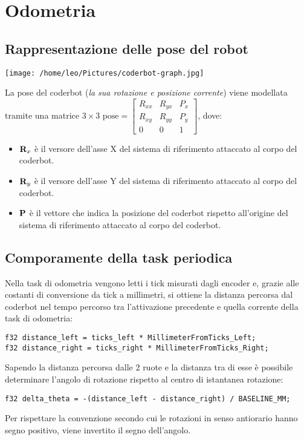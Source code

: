 \documentclass[11pt]{article}
\begin{document}
\section{Odometria}
\label{sec:orgf92f562}
\subsection{Rappresentazione delle pose del robot}
\label{sec:org5b5d30e}
\begin{center}
\texttt{[image: /home/leo/Pictures/coderbot-graph.jpg]}
\end{center}

La pose del coderbot (\emph{la sua rotazione e posizione corrente}) viene modellata tramite una matrice \(3\times3\)  \(\text{pose}=\begin{bmatrix}R_{xx}&R_{yx}&P_x\\R_{xy}&R_{yy}&P_y\\0&0&1\end{bmatrix}\), dove:
\begin{itemize}
\item \(\bold R_{x}\) è il versore dell'asse X del sistema di riferimento attaccato al corpo del coderbot.
\item \(\bold R_{y}\) è il versore dell'asse Y del sistema di riferimento attaccato al corpo del coderbot.
\item \(\bold P\) è il vettore che indica la posizione del coderbot rispetto all'origine del sistema di riferimento attaccato al corpo del coderbot.
\end{itemize}
\subsection{Comporamente della task periodica}
\label{sec:orgd742f41}
Nella task di odometria vengono letti i tick misurati dagli encoder e, grazie alle costanti di conversione da tick a millimetri, si ottiene la distanza percorsa dal coderbot nel tempo percorso tra l'attivazione precedente e quella corrente della task di odometria:
\begin{verbatim}
f32 distance_left = ticks_left * MillimeterFromTicks_Left;
f32 distance_right = ticks_right * MillimeterFromTicks_Right;
\end{verbatim}

Sapendo la distanza percorsa dalle 2 ruote e la distanza tra di esse è possibile determinare l'angolo di rotazione rispetto al centro di istantanea rotazione:
\begin{verbatim}
f32 delta_theta = -(distance_left - distance_right) / BASELINE_MM;
\end{verbatim}
Per rispettare la convenzione secondo cui le rotazioni in senso antiorario hanno segno positivo, viene invertito il segno dell'angolo.
\end{document}
